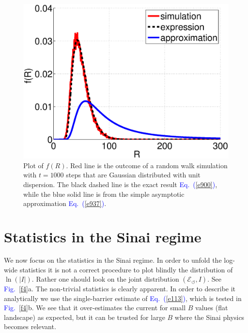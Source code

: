 \documentclass[aps,pre,floats,floatfix,twocolumn]{revtex4}
\newcommand{\Eq}[1]{\textcolor{blue}{Eq.\!\!~(\ref{#1})}}
\newcommand{\Fig}[1]{\textcolor{blue}{Fig.}\!\!~\ref{#1}}
\begin{document}
\begin{figure}

\includegraphics[width=\hsize]{PB_sim.eps}

\caption{
Plot of $f(R)$. Red line is the outcome of a random walk simulation with ${t=1000}$ 
steps that are Gaussian distributed with unit dispersion.   
The black dashed line is the exact result \Eq{e900}, 
while the blue solid line is from the simple asymptotic approximation \Eq{e937}.} 

\label{fb}
\end{figure}











\section{Statistics in the Sinai regime}
\label{sec:in}

We now focus on the statistics in the Sinai regime. 
In order to unfold the log-wide statistics it is 
not a correct procedure to plot blindly the distribution 
of $\ln(|I|)$. Rather one should look on the joint 
distribution ${(\mathcal{E}_{\circlearrowleft},I)}$. 
See \Fig{f4}a. The non-trivial statistics is clearly apparent.
In order to describe it analytically we use 
the single-barrier estimate of \Eq{e113}, 
which is tested in \Fig{f4}b. We see that it 
over-estimates the current for small $B$ values 
(flat landscape) as expected, but it can be trusted 
for large $B$ where the Sinai physics becomes relevant. 
\end{document}
